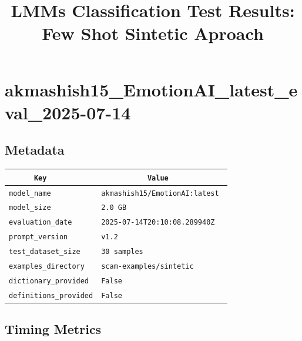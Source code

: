 \documentclass{article}
\begin{document}
\title{LMMs Classification Test Results: Few Shot Sintetic Aproach}\n\maketitle\n\n\section{akmashish15\_EmotionAI\_latest\_eval\_2025-07-14}
\subsection{Metadata}

\begin{center}
\begin{tabular}{l | l} \hline
    \verb|      Key      | & \verb|           Value           | \\ \hline
    \hline
    \verb|model_name    | & \verb|akmashish15/EmotionAI:latest | \\ \hline
    \verb|model_size    | & \verb|2.0 GB                       | \\ \hline
    \verb|evaluation_date| & \verb|2025-07-14T20:10:08.289940Z  | \\ \hline
    \verb|prompt_version| & \verb|v1.2                         | \\ \hline
    \verb|test_dataset_size| & \verb|30 samples                   | \\ \hline
    \verb|examples_directory| & \verb|scam-examples/sintetic       | \\ \hline
    \verb|dictionary_provided| & \verb|False                        | \\ \hline
    \verb|definitions_provided| & \verb|False                        | \\ \hline
\end{tabular}
\end{center}

\subsection{Timing Metrics}
\end{document}
